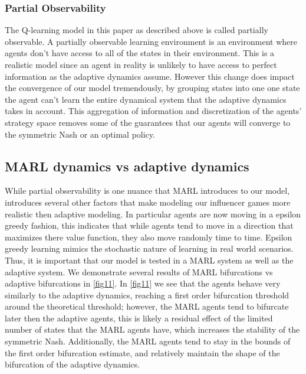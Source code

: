 \documentclass{article}
\begin{document}
            \subsubsection{Partial Observability}
                The Q-learning model in this paper as described above is called partially observable. A partially observable learning environment is an environment where agents don't have access to all of the states in their environment. This is a realistic model since an agent in reality is unlikely to have access to perfect information as the adaptive dynamics assume. However this change does impact the convergence of our model tremendously, by grouping states into one one state the agent can't learn the entire dynamical system that the adaptive dynamics takes in account. This aggregation of information and discretization of the agents' strategy space removes some of the guarantees that our agents will converge to the symmetric Nash or an optimal policy.

        \subsection{MARL dynamics vs adaptive dynamics}
            While partial observability is one nuance that MARL introduces to our model, introduces several other factors that make modeling our influencer games more realistic then adaptive modeling. In particular agents are now moving in a epsilon greedy fashion, this indicates that while agents tend to move in a direction that maximizes there value function, they also move randomly time to time. Epsilon greedy learning mimics the stochastic nature of learning in real world scenarios. Thus, it is important that our model is tested in a MARL system as well as the adaptive system. We demonstrate several results of MARL bifurcations vs adaptive bifurcations in \cref{fig11}. In \cref{fig11} we see that the agents behave very similarly to the adaptive dynamics, reaching a first order bifurcation threshold around the theoretical threshold; however, the MARL agents tend to bifurcate later then the adaptive agents, this is likely a residual effect of the limited number of states that the MARL agents have, which increases the stability of the symmetric Nash. Additionally, the MARL agents tend to stay in the bounds of the first order bifurcation estimate, and relatively maintain the shape of the bifurcation of the adaptive dynamics. 
\end{document}

